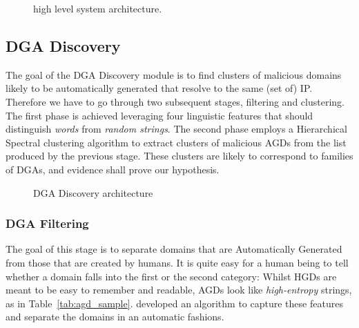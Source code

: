 \begin{figure}[!htp]
    \centering
    \caption{\phoenix high level system architecture.}
    \label{fig:phoenix_architecture}
\end{figure}

\subsection{DGA Discovery} %
\label{sub:dga_discovery}
The goal of the DGA Discovery module is to find clusters of malicious domains
likely to be automatically generated that resolve to the same (set of) IP. Therefore
we have to go through two subsequent stages, filtering and clustering. The first phase
is achieved leveraging four linguistic features that should distinguish \emph{words}
from \emph{random strings}. The second phase employs a Hierarchical Spectral
clustering algorithm to extract clusters of malicious AGDs from the list produced by
the previous stage. These clusters are likely to correspond to families of DGAs, and
evidence shall prove our hypothesis.

\begin{figure}[!htp]
    \centering
    \caption{\phoenix DGA Discovery architecture}
    \label{fig:discovery_architecture}
\end{figure}

\subsubsection{DGA Filtering} %
\label{ssub:dga_filtering}
The goal of this stage is to separate domains that are Automatically Generated from
those that are created by humans.
It is quite easy for a human being to tell whether a domain falls into the first or
the second category: Whilst HGDs are meant to be easy to remember and readable, AGDs
look like \emph{high-entropy} strings, as in Table~\ref{tab:agd_sample}.
\citet{schiavoni2013} developed an algorithm to capture these features and separate
the domains in an automatic fashions.

